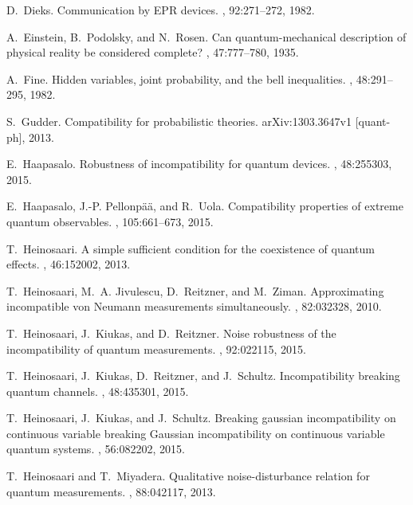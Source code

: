 \documentclass[12pt]{article}
\theoremstyle{definition}
\begin{document}
{\begin{thebibliography}{10}
D.~Dieks.
\newblock Communication by {EPR} devices.
, 92:271--272, 1982.

A.~Einstein, B.~Podolsky, and N.~Rosen.
\newblock Can quantum-mechanical description of physical reality be considered
  complete?
, 47:777--780, 1935.

A.~Fine.
\newblock Hidden variables, joint probability, and the bell inequalities.
, 48:291--295, 1982.

S.~Gudder.
\newblock Compatibility for probabilistic theories.
\newblock arXiv:1303.3647v1 [quant-ph], 2013.

E.~Haapasalo.
\newblock Robustness of incompatibility for quantum devices.
, 48:255303, 2015.

E.~Haapasalo, J.-P. Pellonp\"{a}\"{a}, and R.~Uola.
\newblock Compatibility properties of extreme quantum observables.
, 105:661--673, 2015.

T.~Heinosaari.
\newblock A simple sufficient condition for the coexistence of quantum effects.
, 46:152002, 2013.

T.~Heinosaari, M.~A. Jivulescu, D.~Reitzner, and M.~Ziman.
\newblock Approximating incompatible von {N}eumann measurements simultaneously.
, 82:032328, 2010.

T.~Heinosaari, J.~Kiukas, and D.~Reitzner.
\newblock Noise robustness of the incompatibility of quantum measurements.
, 92:022115, 2015.

T.~Heinosaari, J.~Kiukas, D.~Reitzner, and J.~Schultz.
\newblock Incompatibility breaking quantum channels.
, 48:435301, 2015.

T.~Heinosaari, J.~Kiukas, and J.~Schultz.
\newblock Breaking gaussian incompatibility on continuous variable breaking
  {G}aussian incompatibility on continuous variable quantum systems.
, 56:082202, 2015.

T.~Heinosaari and T.~Miyadera.
\newblock Qualitative noise-disturbance relation for quantum measurements.
, 88:042117, 2013.


\end{thebibliography}}
\end{document}
